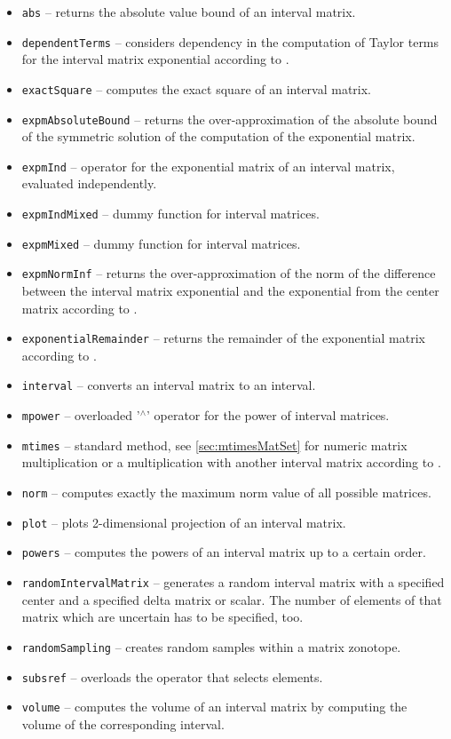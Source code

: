 \begin{itemize}
 \item \texttt{abs} -- returns the absolute value bound of an interval matrix.
 \item \texttt{dependentTerms} -- considers dependency in the computation of Taylor terms for the interval matrix exponential according to \cite[Proposition 4.4]{Althoff2011b}. 
 \item \texttt{exactSquare} -- computes the exact square of an interval matrix.
 \item \texttt{expmAbsoluteBound} -- returns the over-approximation of the absolute bound
of the symmetric solution of the computation of the exponential matrix.
 \item \texttt{expmInd} -- operator for the exponential matrix of an interval matrix, evaluated independently.
 \item \texttt{expmIndMixed} -- dummy function for interval matrices.
 \item \texttt{expmMixed} -- dummy function for interval matrices.
 \item \texttt{expmNormInf} -- returns the over-approximation of the norm of the difference between the interval matrix exponential and the exponential from the center matrix according to \cite[Theorem 4.2]{Althoff2011b}.
 \item \texttt{exponentialRemainder} -- returns the remainder of the exponential matrix according to \cite[Proposition 4.1]{Althoff2011b}.
 \item \texttt{interval} -- converts an interval matrix to an interval.
 \item \texttt{mpower} -- overloaded '${}^{\wedge}$' operator for the power of interval matrices.
 \item \texttt{mtimes} -- standard method, see \cref{sec:mtimesMatSet} for numeric matrix multiplication or a multiplication with another interval matrix according to \cite[Equation 4.11]{Althoff2011b}.
 \item \texttt{norm} -- computes exactly the maximum norm value of all possible matrices.
 \item \texttt{plot} -- plots 2-dimensional projection of an interval matrix.
 \item \texttt{powers} -- computes the powers of an interval matrix up to a certain order.
 \item \texttt{randomIntervalMatrix} -- generates a random interval matrix with a specified center and a specified delta matrix or scalar. The number of elements of that matrix which are uncertain has to be specified, too.
 \item \texttt{randomSampling} -- creates random samples within a matrix zonotope.
 \item \texttt{subsref} -- overloads the operator that selects elements.
 \item \texttt{volume} -- computes the volume of an interval matrix by computing the volume of the corresponding interval.
\end{itemize}
